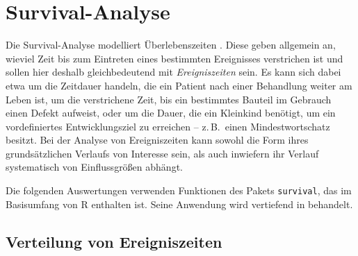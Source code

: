 \chapter{Survival-Analyse}
\label{sec:survival}

Die Survival-Analyse modelliert Überlebenszeiten \cite{HosmerJr2008,Klein2003}. Diese geben allgemein an, wieviel Zeit bis zum Eintreten eines bestimmten Ereignisses verstrichen ist und sollen hier deshalb gleichbedeutend mit \emph{Ereigniszeiten} sein. Es kann sich dabei etwa um die Zeitdauer handeln, die ein Patient nach einer Behandlung weiter am Leben ist, um die verstrichene Zeit, bis ein bestimmtes Bauteil im Gebrauch einen Defekt aufweist, oder um die Dauer, die ein Kleinkind benötigt, um ein vordefiniertes Entwicklungsziel zu erreichen -- z.\,B.\ einen Mindestwortschatz besitzt. Bei der Analyse von Ereigniszeiten kann sowohl die Form ihres grundsätzlichen Verlaufs von Interesse sein, als auch inwiefern ihr Verlauf systematisch von Einflussgrößen abhängt.

Die folgenden Auswertungen verwenden Funktionen des Pakets \lstinline!survival!, das im Basisumfang von R enthalten ist. Seine Anwendung wird vertiefend in  behandelt.

\section{Verteilung von Ereigniszeiten}
\label{sec:survDistrib}


